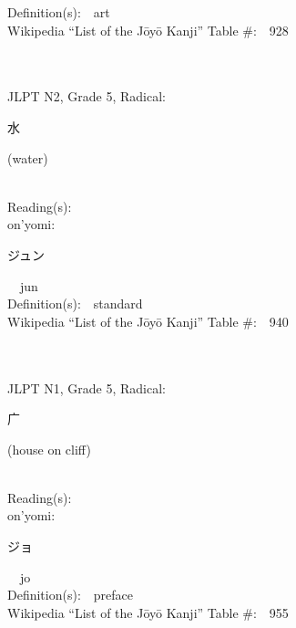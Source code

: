 \begin{multicols}{2}
Definition(s):\ \ art \\
Wikipedia ``List of the J\=oy\=o Kanji'' Table \#:\ \ 928 \\
\ \ \\
{\fontsize{34pt}{40pt}  }\ \ \\  %
{JLPT N2, Grade 5, Radical:\ \ {\begin{CJK}{UTF8}{min} 水 \end{CJK}} (water) } \\
Reading(s):\ \ \\
{\hspace*{1em}}on'yomi:\ \ \\
{\hspace*{2em}}{\begin{CJK}{UTF8}{min} ジュン \end{CJK}}\ \ jun\ \ \\
Definition(s):\ \ standard \\
Wikipedia ``List of the J\=oy\=o Kanji'' Table \#:\ \ 940 \\
\ \ \\
{\fontsize{34pt}{40pt}  }\ \ \\  %
{JLPT N1, Grade 5, Radical:\ \ {\begin{CJK}{UTF8}{min} 广 \end{CJK}} (house on cliff) } \\
Reading(s):\ \ \\
{\hspace*{1em}}on'yomi:\ \ \\
{\hspace*{2em}}{\begin{CJK}{UTF8}{min} ジョ \end{CJK}}\ \ jo\ \ \\
Definition(s):\ \ preface \\
Wikipedia ``List of the J\=oy\=o Kanji'' Table \#:\ \ 955 \\
\ \ \\
{\fontsize{34pt}{40pt}  }\ \ \\  %

\end{multicols}
